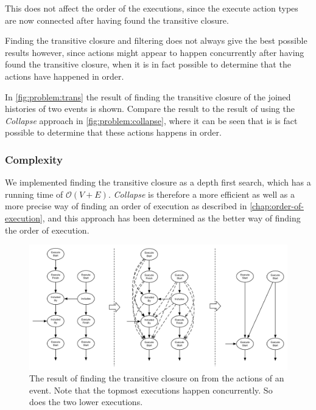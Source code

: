 	This does not affect the order of the executions, since the execute action types are now connected after having found the transitive closure.
	
	\newpar Finding the transitive closure and filtering does not always give the best possible results however, since actions might appear to happen concurrently after having found the transitive closure, when it is in fact possible to determine that the actions have happened in order. 
	
	\newpar In \autoref{fig:problem:trans} the result of finding the transitive closure of the joined histories of two events is shown. 
	Compare the result to the result of using the \textit{Collapse} approach in \autoref{fig:problem:collapse}, where it can be seen that is is fact possible to determine that these actions happens in order.
	
	\subsubsection{Complexity}
	We implemented finding the transitive closure as a depth first search, which has a running time of $\mathcal{O}(V + E)$. \textit{Collapse} is therefore a more efficient as well as a more precise way of finding an order of execution as described in \autoref{chap:order-of-execution}, and this approach has been determined as the better way of finding the order of execution.
	
	\begin{figure}
		\centering
		\includegraphics[width=\textwidth]{6orderofexecution/images/trans.pdf}
		\caption{The result of finding the transitive closure on from the actions of an event. Note that the topmost executions happen concurrently. So does the two lower executions.}
		\label{fig:problem:trans}
	\end{figure}
	
